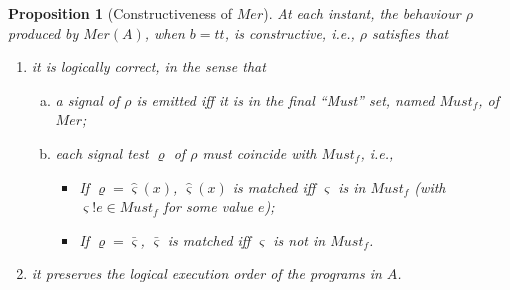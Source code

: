 \documentclass{fcs}
\newtheorem{prop}{Proposition}[section]
\newcommand{\sig}[0]{\varsigma}
\newcommand{\true}[0]{\mathit{tt}}
\newcommand{\Must}[0]{\mathit{Must}}
\newcommand{\Merge}[0]{\mathit{Mer}}
\begin{document}
\begin{prop}[Constructiveness of $\Merge$]
\label{prop:Merge is constructive}
At each instant, the behaviour $\rho$ produced by $\Merge(A)$, when $b=\true$, is constructive, i.e., $\rho$ satisfies that
\begin{enumerate}
    \item it is logically correct, in the sense that
        \begin{enumerate}[(a)]
        \item a signal of $\rho$ is emitted iff it is in the final ``Must'' set, named $\Must_f$, of $\Merge$;
        \item each signal test $\varrho$ of $\rho$ must coincide with $\Must_f$, i.e.,
            \begin{itemize}
            \item If $\varrho=\hat{\sig}(x)$, $\hat{\sig}(x)$ is matched iff $\sig$ is in $\Must_f$ (with $\sig!e\in \Must_f$ for some value $e$);
            \item If $\varrho=\bar{\sig}$, $\bar{\sig}$ is matched iff $\sig$ is not in $\Must_f$.
            \end{itemize}
        \end{enumerate}
    \item it preserves the logical execution order of the programs in $A$.
\end{enumerate}
\end{prop}
\end{document}
